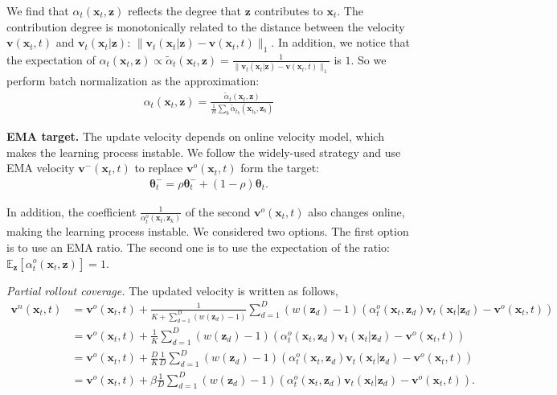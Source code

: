 \documentclass{article} %
\begin{document}
We find that
$\alpha_t(\mathbf{x}_t,\mathbf{z})$
reflects
the degree
that 
$\mathbf{z}$ contributes to $\mathbf{x}_t$.
The contribution degree
is monotonically related to 
the distance between 
the velocity $\mathbf{v}(\mathbf{x}_t,t)$ and 
$\mathbf{v}_t(\mathbf{x}_t | \mathbf{z})$:
$
\|
\mathbf{v}_t(\mathbf{x}_t | \mathbf{z})
- \mathbf{v}(\mathbf{x}_t,t)\|_1
$.
In addition,
we notice that 
the expectation of 
$\alpha_t(\mathbf{x}_t,\mathbf{z})
\propto \tilde{\alpha}_t(\mathbf{x}_t,\mathbf{z})
=
\frac{1}
{
\|
\mathbf{v}_t(\mathbf{x}_t | \mathbf{z})
- \mathbf{v}(\mathbf{x}_t,t)\|_1}
$
is $1$.
So we perform batch normalization
as the approximation:
\begin{align}
    \alpha_t(\mathbf{x}_t,\mathbf{z})
    = \frac{\tilde{\alpha}_t(\mathbf{x}_t,\mathbf{z})}
    {
    \frac{1}{B}
    \sum_b \tilde{\alpha}_{t_b}(\mathbf{x}_{t_b},\mathbf{z}_b)
    }
\end{align}






\noindent\textbf{EMA target.}
The update velocity depends on
online velocity model, 
which makes the learning process instable.
We follow the widely-used strategy
and use EMA velocity $\mathbf{v}^{-}(\mathbf{x}_t,t)$ to
replace 
$\mathbf{v}^o(\mathbf{x}_t,t)$
form the target:
\begin{align}
    \boldsymbol{\theta}^{-}_t
    = \rho \boldsymbol{\theta}^{-}_t
    + (1-\rho) \boldsymbol{\theta}_t.
\end{align}

In addition,
the coefficient 
$\frac{1}{\alpha^o_t(\mathbf{x}_t,\mathbf{z}_k)}$ of
the second $\mathbf{v}^o(\mathbf{x}_t,t)$
also changes online,
making the learning process instable.
We considered two options.
The first option
is to use an EMA ratio.
The second one is
to use the expectation 
of the ratio:
$\mathbb{E}_{\mathbf{z}}[\alpha^o_t(\mathbf{x}_t,\mathbf{z})] = 1$.

{
\color{gray}
\emph{Partial rollout coverage.}
The updated velocity
is written as follows,
\begin{align}
        \mathbf{v}^{n}(\mathbf{x}_t,t)
&=  \mathbf{v}^o(\mathbf{x}_t,t)
+ \frac{1}{K + \sum_{d=1}^D
    ( w(\mathbf{z}_d) - 1)} 
\sum_{d=1}^D
    ( w(\mathbf{z}_d) - 1)
    (
\alpha^o_t(\mathbf{x}_t,\mathbf{z}_d)
\mathbf{v}_t(\mathbf{x}_t|\mathbf{z}_d)
- \mathbf{v}^o(\mathbf{x}_t,t)
) \\
&=  \mathbf{v}^o(\mathbf{x}_t,t)
+ \frac{1}{K}
\sum_{d=1}^D
    ( w(\mathbf{z}_d) - 1)
    (
\alpha^o_t(\mathbf{x}_t,\mathbf{z}_d)
\mathbf{v}_t(\mathbf{x}_t|\mathbf{z}_d)
- \mathbf{v}^o(\mathbf{x}_t,t)
) \\
&=  \mathbf{v}^o(\mathbf{x}_t,t)
+ \frac{D}{K}  
\frac{1}{D}
\sum_{d=1}^D
    ( w(\mathbf{z}_d) - 1)
    (
\alpha^o_t(\mathbf{x}_t,\mathbf{z}_d)
\mathbf{v}_t(\mathbf{x}_t|\mathbf{z}_d)
- \mathbf{v}^o(\mathbf{x}_t,t)
) \\
&=  \mathbf{v}^o(\mathbf{x}_t,t)
+ \beta 
\frac{1}{D}
\sum_{d=1}^D
    ( w(\mathbf{z}_d) - 1)
    (
\alpha^o_t(\mathbf{x}_t,\mathbf{z}_d)
\mathbf{v}_t(\mathbf{x}_t|\mathbf{z}_d)
- \mathbf{v}^o(\mathbf{x}_t,t)
) 
.
\end{align}
}
\end{document}
